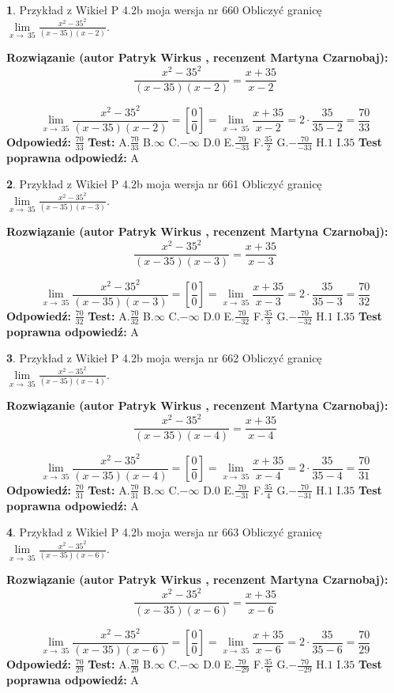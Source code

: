\documentclass[12pt, a4paper]{article}
\theoremstyle{definition} %
\newtheorem{zad}{}
\newcommand{\zadStart}[1]{\begin{zad}#1\newline}
\newcommand{\zadStop}{\end{zad}}
\newcommand{\rozwStart}[2]{\noindent \textbf{Rozwiązanie (autor #1 , recenzent #2): }\newline}
\newcommand{\rozwStop}{\newline}
\newcommand{\odpStart}{\noindent \textbf{Odpowiedź:}\newline}
\newcommand{\odpStop}{\newline}
\newcommand{\testStart}{\noindent \textbf{Test:}\newline}
\newcommand{\testStop}{\newline}
\newcommand{\kluczStart}{\noindent \textbf{Test poprawna odpowiedź:}\newline}
\newcommand{\kluczStop}{\newline}
\begin{document}
\zadStart{Przykład z Wikieł P 4.2b moja wersja nr 660}
Obliczyć granicę $\lim\limits_{x\to\ 35}\frac{x^{2}-35^{2}}{(x-35)(x-2)}$.
\zadStop
\rozwStart{Patryk Wirkus}{Martyna Czarnobaj}
$$\frac{x^{2}-35^{2}}{(x-35)(x-2)}=\frac{x+35}{x-2}$$

$$\lim\limits_{x\to\ 35}\frac{x^{2}-35^{2}}{(x-35)(x-2)}=[\frac{0}{0}]=\lim\limits_{x\to\ 35}\frac{x+35}{x-2}=2 \cdot \frac{35}{35-2} = \frac{70}{33}$$
\rozwStop
\odpStart
$\frac{70}{33}$
\odpStop
\testStart
A.$\frac{70}{33}$
B.$\infty$
C.$-\infty$
D.$0$
E.$\frac{70}{-33}$
F.$\frac{35}{2}$
G.$-\frac{70}{-33}$
H.$1$
I.$35$
\testStop
\kluczStart
A
\kluczStop



\zadStart{Przykład z Wikieł P 4.2b moja wersja nr 661}
Obliczyć granicę $\lim\limits_{x\to\ 35}\frac{x^{2}-35^{2}}{(x-35)(x-3)}$.
\zadStop
\rozwStart{Patryk Wirkus}{Martyna Czarnobaj}
$$\frac{x^{2}-35^{2}}{(x-35)(x-3)}=\frac{x+35}{x-3}$$

$$\lim\limits_{x\to\ 35}\frac{x^{2}-35^{2}}{(x-35)(x-3)}=[\frac{0}{0}]=\lim\limits_{x\to\ 35}\frac{x+35}{x-3}=2 \cdot \frac{35}{35-3} = \frac{70}{32}$$
\rozwStop
\odpStart
$\frac{70}{32}$
\odpStop
\testStart
A.$\frac{70}{32}$
B.$\infty$
C.$-\infty$
D.$0$
E.$\frac{70}{-32}$
F.$\frac{35}{3}$
G.$-\frac{70}{-32}$
H.$1$
I.$35$
\testStop
\kluczStart
A
\kluczStop



\zadStart{Przykład z Wikieł P 4.2b moja wersja nr 662}
Obliczyć granicę $\lim\limits_{x\to\ 35}\frac{x^{2}-35^{2}}{(x-35)(x-4)}$.
\zadStop
\rozwStart{Patryk Wirkus}{Martyna Czarnobaj}
$$\frac{x^{2}-35^{2}}{(x-35)(x-4)}=\frac{x+35}{x-4}$$

$$\lim\limits_{x\to\ 35}\frac{x^{2}-35^{2}}{(x-35)(x-4)}=[\frac{0}{0}]=\lim\limits_{x\to\ 35}\frac{x+35}{x-4}=2 \cdot \frac{35}{35-4} = \frac{70}{31}$$
\rozwStop
\odpStart
$\frac{70}{31}$
\odpStop
\testStart
A.$\frac{70}{31}$
B.$\infty$
C.$-\infty$
D.$0$
E.$\frac{70}{-31}$
F.$\frac{35}{4}$
G.$-\frac{70}{-31}$
H.$1$
I.$35$
\testStop
\kluczStart
A
\kluczStop



\zadStart{Przykład z Wikieł P 4.2b moja wersja nr 663}
Obliczyć granicę $\lim\limits_{x\to\ 35}\frac{x^{2}-35^{2}}{(x-35)(x-6)}$.
\zadStop
\rozwStart{Patryk Wirkus}{Martyna Czarnobaj}
$$\frac{x^{2}-35^{2}}{(x-35)(x-6)}=\frac{x+35}{x-6}$$

$$\lim\limits_{x\to\ 35}\frac{x^{2}-35^{2}}{(x-35)(x-6)}=[\frac{0}{0}]=\lim\limits_{x\to\ 35}\frac{x+35}{x-6}=2 \cdot \frac{35}{35-6} = \frac{70}{29}$$
\rozwStop
\odpStart
$\frac{70}{29}$
\odpStop
\testStart
A.$\frac{70}{29}$
B.$\infty$
C.$-\infty$
D.$0$
E.$\frac{70}{-29}$
F.$\frac{35}{6}$
G.$-\frac{70}{-29}$
H.$1$
I.$35$
\testStop
\kluczStart
A
\kluczStop
\end{document}
